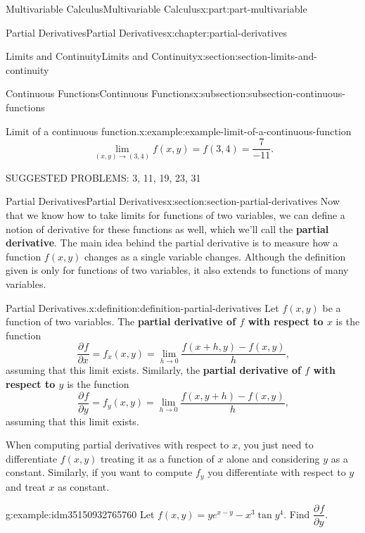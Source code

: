 \documentclass[twoside,10pt,]{book}
\newcommand{\terminology}[1]{\textbf{#1}}
\numberwithin{equation}{part}
\newcommand{\pdv}[3][]{\dfrac{\partial^{#1} #2}{\partial #3^{#1}}}
\begin{document}
\begin{partptx}{Multivariable Calculus}{}{Multivariable Calculus}{}{}{x:part:part-multivariable}
\begin{chapterptx}{Partial Derivatives}{}{Partial Derivatives}{}{}{x:chapter:partial-derivatives}
\begin{sectionptx}{Limits and Continuity}{}{Limits and Continuity}{}{}{x:section:section-limits-and-continuity}
\begin{subsectionptx}{Continuous Functions}{}{Continuous Functions}{}{}{x:subsection:subsection-continuous-functions}
\begin{example}{Limit of a continuous function.}{x:example:example-limit-of-a-continuous-function}
\begin{equation*}
\lim_{(x,y)\to(3,4)}f(x,y) = f(3,4) = \frac{7}{-11}.
\end{equation*}
%
\end{example}
\end{subsectionptx}
\begin{conclusion}{}%
SUGGESTED PROBLEMS: 3, 11, 19, 23, 31%
\end{conclusion}%
\end{sectionptx}
%
%
\typeout{************************************************}
\typeout{************************************************}
%
\begin{sectionptx}{Partial Derivatives}{}{Partial Derivatives}{}{}{x:section:section-partial-derivatives}
Now that we know how to take limits for functions of two variables, we can define a notion of derivative for these functions as well, which we'll call the \terminology{partial derivative}. The main idea behind the partial derivative is to measure how a function \(f(x,y)\) changes as a single variable changes. Although the definition given is only for functions of two variables, it also extends to functions of many variables.\begin{definition}{Partial Derivatives.}{x:definition:definition-partial-derivatives}%
%
Let \(f(x,y)\) be a function of two variables. The \terminology{partial derivative of \(f\) with respect to \(x\)} is the function%
\begin{equation*}
\pdv{f}{x} = f_{x}(x,y) = \lim_{h\to0}\frac{f(x+h,y)-f(x,y)}{h}\text{,}
\end{equation*}
assuming that this limit exists. Similarly, the \terminology{partial derivative of \(f\) with respect to \(y\)} is the function%
\begin{equation*}
\pdv{f}{y} = f_{y}(x,y) = \lim_{h\to0}\frac{f(x,y+h)-f(x,y)}{h}\text{,}
\end{equation*}
assuming that this limit exists.%
\end{definition}
When computing partial derivatives with respect to \(x\), you just need to differentiate \(f(x,y)\) treating it as a function of \(x\) alone and considering \(y\) as a constant. Similarly, if you want to compute \(f_{y}\) you differentiate with respect to \(y\) and treat \(x\) as constant.%
\begin{example}{}{g:example:idm35150932765760}%
Let \(f(x,y) = ye^{x-y} - x^{3}\tan y^{4}\). Find \(\pdv{f}{y}\).%
\par\smallskip%

\end{example}
\end{sectionptx}
\end{chapterptx}
\end{partptx}
\end{document}
